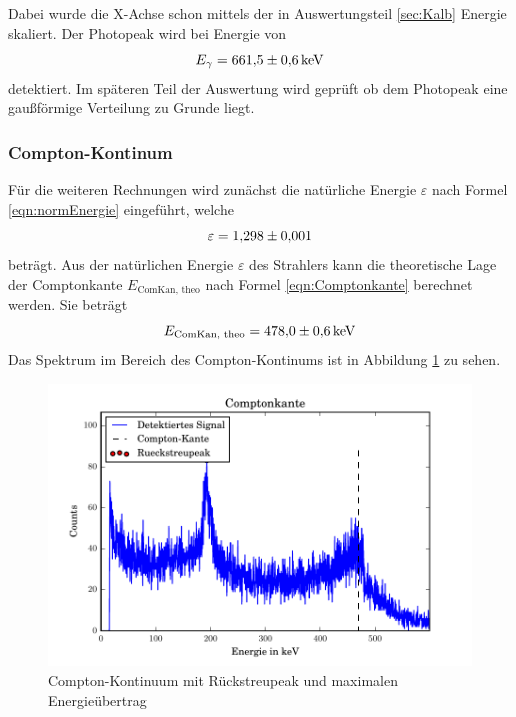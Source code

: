 Dabei wurde die X-Achse schon mittels der in Auswertungsteil \ref{sec:Kalb} Energie skaliert. Der Photopeak wird bei Energie von
\begin{equation}
  E_\gamma = \num{661,5 +- 0,6} \, \text{keV}
  \label{eqn:CsPhoto}
\end{equation}
detektiert. Im späteren Teil der Auswertung wird geprüft ob dem Photopeak eine gaußförmige Verteilung zu Grunde liegt.


\subsubsection{Compton-Kontinum}
Für die weiteren Rechnungen wird zunächst die natürliche Energie $\varepsilon$ nach Formel \ref{eqn:normEnergie} eingeführt, welche
\begin{equation}
\varepsilon = \num{1,298 +- 0,001}
  \label{eqn:nE}
\end{equation}
beträgt. Aus der natürlichen Energie $\varepsilon$ des Strahlers kann die theoretische Lage der Comptonkante $E_\text{ComKan, theo}$ nach Formel \ref{eqn:Comptonkante} berechnet werden. Sie beträgt
\begin{equation}
  E_\text{ComKan, theo} = \num{478,0 +- 0,6} \, \text{keV}
  \label{eqn:KanTheo}
\end{equation}
Das Spektrum im Bereich des Compton-Kontinums ist in Abbildung \ref{fig:Compt} zu sehen.

\begin{figure}[htpb]
  \centering
  \includegraphics[width=\textwidth]{./build/Compton.pdf}
  \caption{Compton-Kontinuum mit Rückstreupeak und maximalen Energieübertrag}
  \label{fig:Compt}
\end{figure}

